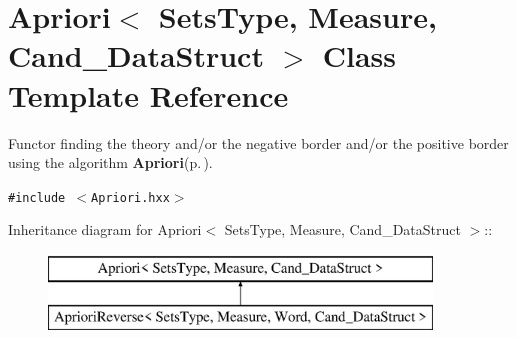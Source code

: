 \section{Apriori$<$ Sets\-Type, Measure, Cand\_\-Data\-Struct $>$ Class Template Reference}
\label{class_apriori}
Functor finding the theory and/or the negative border and/or the positive border using the algorithm {\bf Apriori}{\rm (p.\,\pageref{class_apriori})}.  


{\tt \#include $<$Apriori.hxx$>$}

Inheritance diagram for Apriori$<$ Sets\-Type, Measure, Cand\_\-Data\-Struct $>$::\begin{figure}[H]
\begin{center}
\leavevmode
\includegraphics[height=2cm]{class_apriori}
\end{center}
\end{figure}
